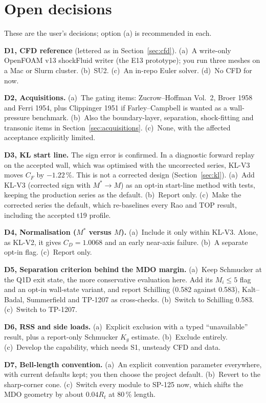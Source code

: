 \section{Open decisions}
\label{sec:decisions}
These are the user's decisions; option (a) is recommended in each.

\textbf{D1, CFD reference} (lettered as in Section~\ref{sec:cfd}).
(a)~A write-only OpenFOAM v13 shockFluid writer (the E13 prototype); you run three
meshes on a Mac or Slurm cluster.
(b)~SU2.
(c)~An in-repo Euler solver.
(d)~No CFD for now.

\textbf{D2, Acquisitions.}
(a)~The gating items: Zucrow--Hoffman Vol.~2, Broer 1958 and Ferri 1954, plus
Clippinger 1951 if Farley--Campbell is wanted as a wall-pressure benchmark.
(b)~Also the boundary-layer, separation, shock-fitting and transonic items in
Section~\ref{sec:acquisitions}.
(c)~None, with the affected acceptance explicitly limited.

\textbf{D3, KL start line.} The sign error is confirmed. In a diagnostic forward replay
on the accepted wall, which was optimised with the uncorrected series, KL-V3 moves $C_F$
by $-1.22$\,\%. This is not a corrected design (Section~\ref{sec:kl}).
(a)~Add KL-V3 (corrected sign with $M^*\to M$) as an opt-in start-line method with
tests, keeping the production series as the default.
(b)~Report only.
(c)~Make the corrected series the default, which re-baselines every Rao and TOP result,
including the accepted t19 profile.

\textbf{D4, Normalisation ($M^*$ versus $M$).}
(a)~Include it only within KL-V3. Alone, as KL-V2, it gives $C_D=1.0068$ and an early
near-axis failure.
(b)~A separate opt-in flag.
(c)~Report only.

\textbf{D5, Separation criterion behind the MDO margin.}
(a)~Keep Schmucker at the Q1D exit state, the more conservative evaluation here. Add
its $M_i\le5$ flag and an opt-in wall-state variant, and report Schilling (0.582
against 0.583), Kalt--Badal, Summerfield and TP-1207 as cross-checks.
(b)~Switch to Schilling 0.583.
(c)~Switch to TP-1207.

\textbf{D6, RSS and side loads.}
(a)~Explicit exclusion with a typed ``unavailable'' result, plus a report-only Schmucker
$K_g$ estimate.
(b)~Exclude entirely.
(c)~Develop the capability, which needs S1, unsteady CFD and data.

\textbf{D7, Bell-length convention.}
(a)~An explicit convention parameter everywhere, with current defaults kept; you then
choose the project default.
(b)~Revert to the sharp-corner cone.
(c)~Switch every module to SP-125 now, which shifts the MDO geometry by about $0.04R_t$
at 80\,\% length.

